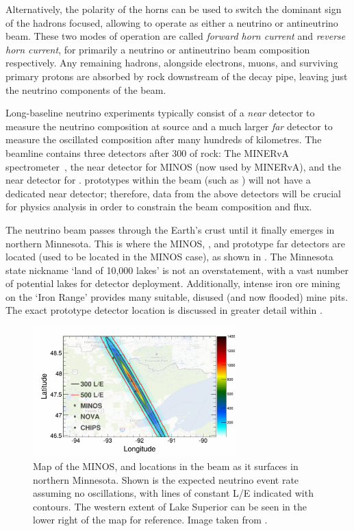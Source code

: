 Alternatively, the polarity of the horns can be used to switch the dominant sign of the hadrons
focused, allowing \numi to operate as either a neutrino or antineutrino beam. These two modes of
operation are called \emph{forward horn current} and \emph{reverse horn current}, for primarily a
neutrino or antineutrino beam composition respectively. Any remaining hadrons, alongside
electrons, muons, and surviving primary protons are absorbed by rock downstream of the decay pipe,
leaving just the neutrino components of the beam.

Long-baseline neutrino experiments typically consist of a \emph{near} detector to measure the
neutrino composition at source and a much larger \emph{far} detector to measure the oscillated
composition after many hundreds of kilometres. The \numi beamline contains three detectors after
\SI{300}{} of rock: The MINERvA spectrometer~\cite{mcfarland2006}, the near detector for
MINOS (now used by MINERvA), and the near detector for \nova. \chips prototypes within the \numi
beam (such as \chipsfive) will not have a dedicated near detector; therefore, data from the above
detectors will be crucial for physics analysis in order to constrain the beam composition and
flux.

The \numi neutrino beam passes through the Earth's crust until it finally emerges in northern
Minnesota. This is where the MINOS, \nova, and prototype \chips far detectors are located (used to
be located in the MINOS case), as shown in . The Minnesota state nickname
`land of 10,000 lakes' is not an overstatement, with a vast number of potential lakes for \chips
detector deployment. Additionally, intense iron ore mining on the `Iron Range' provides many
suitable, disused (and now flooded) mine pits. The exact \chipsfive prototype detector location is
discussed in greater detail within .

\begin{figure} %
    \includegraphics[width=0.7\textwidth]{diagrams/4-chips/numi_map.pdf}
    \caption[Map of detector locations in the \numi beam]
    {Map of the MINOS, \nova and \chips locations in the \numi beam as it surfaces in northern
        Minnesota. Shown is the expected neutrino event rate assuming no oscillations, with lines
        of constant L/E indicated with contours. The western extent of Lake Superior can be seen
        in the lower right of the map for reference. Image taken from .}
    \label{fig:numi_map}
\end{figure}

